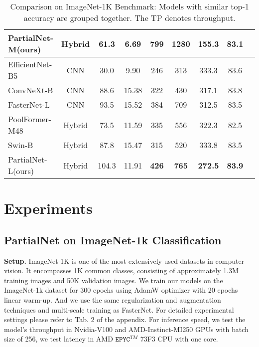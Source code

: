 \begin{table*}[ht]
{\begin{tabular}{@{}lcccccccc@{}}
    PartialNet-M(ours)                  &Hybrid   & 61.3      & 6.69  &{\bf 799}  & {\bf 1280}  & {\bf 155.3} & {\bf 83.1} \\
    \hline
    EfficientNet-B5\cite{Tan2019}       &CNN      & 30.0      & 9.90  &246        & 313         & 333.3       & 83.6       \\
    ConvNeXt-B\cite{Liu2022b}           &CNN      & 88.6      & 15.38 &322        & 430         & 317.1       & 83.8       \\
    FasterNet-L\cite{Chen2023}          &CNN      & 93.5      & 15.52 &384        & 709         & 312.5       & 83.5       \\
    PoolFormer-M48\cite{Yu2022a}        &Hybrid   & 73.5      & 11.59 &335        & 556         & 322.3       & 82.5       \\
    Swin-B\cite{Liu2021c}               &Hybrid   & 87.8      & 15.47 &315        & 520         & 333.8       & 83.5       \\
    PartialNet-L(ours)                  &Hybrid   & 104.3     & 11.91 &{\bf 426}  & {\bf 765}   & {\bf 272.5} & {\bf 83.9} \\
    \bottomrule
  \end{tabular}
  }
  \caption{Comparison on ImageNet-1K Benchmark: Models with similar top-1 accuracy are grouped together. The TP denotes throughput.}
  \label{tab:class_Benchmark}
\end{table*}

\section{Experiments}
\label{sec:experiments}
\subsection{PartialNet on ImageNet-1k Classification}
{\bf Setup.} ImageNet-1K is one of the most extensively used datasets in computer vision. It encompasses 1K common classes, consisting of approximately 1.3M training images and 50K validation images. We train our models on the ImageNet-1k dataset for 300 epochs using AdamW optimizer with 20 epochs linear warm-up. And we use the same regularization and augmentation techniques and multi-scale training as FasterNet. For detailed experimental settings please refer to Tab. 2 of the appendix. For inference speed, we test the model's throughput in Nvidia-V100 and AMD-Instinct-MI250 GPUs with batch size of 256, we test latency in AMD $\texttt{EPYC}^{TM}$ 73F3 CPU with one core.  

